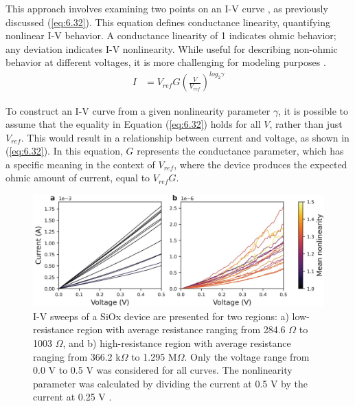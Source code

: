 \noindent This approach involves examining two points on an I-V curve \cite{lentz2013current}, as previously discussed (\ref{eq:6.32}). This equation defines conductance linearity, quantifying nonlinear I-V behavior. A conductance linearity of 1 indicates ohmic behavior; any deviation indicates I-V nonlinearity. While useful for describing non-ohmic behavior at different voltages, it is more challenging for modeling purposes \cite{sung2018effect}.
\begin{align}
I & = V_{ref}G\left ( \frac{V}{V_{ref}} \right )^{log_2 \gamma} \label{eq:6.36}
\end{align}


\noindent To construct an I-V curve from a given nonlinearity parameter $\gamma$, it is possible to assume that the equality in Equation (\ref{eq:6.32}) holds for all $V$, rather than just $V_{ref}$. This would result in a relationship between current and voltage, as shown in (\ref{eq:6.32}). In this equation, $G$ represents the conductance parameter, which has a specific meaning in the context of $V_{ref}$, where the device produces the expected ohmic amount of current, equal to $V_{ref} G$.

\begin{figure}[htbp!] 
\centering    
\includegraphics[width=1\textwidth]{Chapter6/Figs/h.png}
\caption[I-V sweeps of a SiOx device are presented for two regions]{I-V sweeps of a SiOx device are presented for two regions: a) low-resistance region with average resistance ranging from 284.6 $\Omega$ to 1003 $\Omega$, and b) high-resistance region with average resistance ranging from 366.2 k$\Omega$ to 1.295 M$\Omega$. Only the voltage range from 0.0 V to 0.5 V was considered for all curves. The nonlinearity parameter was calculated by dividing the current at 0.5 V by the current at 0.25 V \cite{joksas2022nonideality}.}
\label{fig:6h}
\end{figure}

